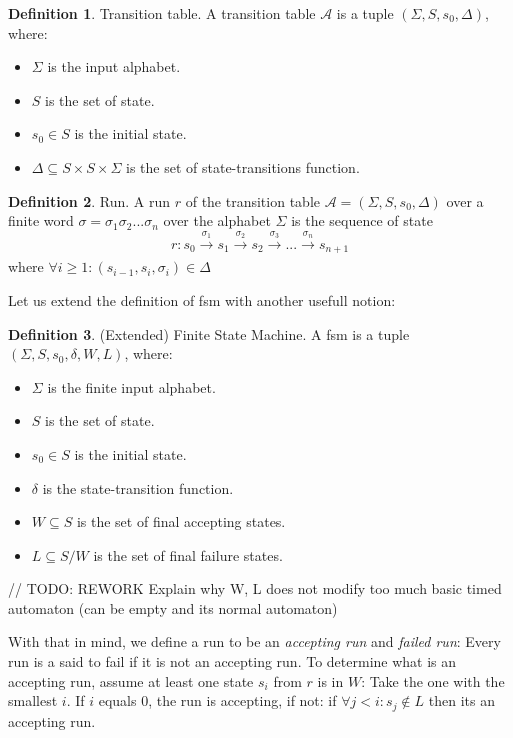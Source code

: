 \documentclass[12pt]{article}
\theoremstyle{definition}
\newtheorem{definition}{Definition}[section]
\theoremstyle{definition}
\newcommand{\A}{\mathcal{A}}
\begin{document}
\theoremstyle{definition}
\begin{definition}{Transition table.} A transition table $\A$ is a tuple $(\Sigma, S, s_{0}, \Delta)$, where:
\begin{itemize}
\item $\Sigma$ is the input alphabet.
\item $S$ is the set of state.
\item $s_{0} \in S$ is the initial state.
\item $\Delta \subseteq S \times S \times \Sigma$ is the set of state-transitions function.
\end{itemize}
\end{definition}

\theoremstyle{definition}
\begin{definition}{Run.} A run $r$ of the transition table $\A = (\Sigma, S, s_{0}, \Delta)$ over a finite word $\sigma = \sigma_1 \sigma_2 ... \sigma_n$ over the alphabet $\Sigma$ is the sequence of state
$$r: s_0 \xrightarrow[]{\sigma_1} s_1 \xrightarrow[]{\sigma_2} s_2 \xrightarrow[]{\sigma_3} ... \xrightarrow[]{\sigma_n} s_{n+1}$$ where $\forall i \ge 1: (s_{i-1}, s_i, \sigma_i) \in \Delta$
\end{definition}

Let us extend the definition of \gls{fsm} with another usefull notion:
\theoremstyle{definition}
\begin{definition}{(Extended) Finite State Machine.} A \gls{fsm} is a tuple $(\Sigma, S, s_{0},\delta, W, L)$, where:
\begin{itemize}
\item $\Sigma$ is the finite input alphabet.
\item $S$ is the set of state.
\item $s_{0} \in S$ is the initial state.
\item $\delta$ is the state-transition function.
\item $W \subseteq S$ is the set of final accepting states.
\item $L \subseteq S / W$ is the set of final failure states.
\end{itemize}
\end{definition}

// TODO: REWORK Explain why W, L does not modify too much basic timed automaton (can be empty and its normal automaton)

With that in mind, we define a run to be an \textit{accepting run} and \textit{failed run}: Every run is a said to fail if it is not an accepting run. To determine what is an accepting run, assume at least one state $s_i$ from $r$ is in $W$: Take the one with the smallest $i$. If $i$ equals $0$, the run is accepting, if not: if $\forall j < i: s_j \notin L$ then its an accepting run.
\end{document}
